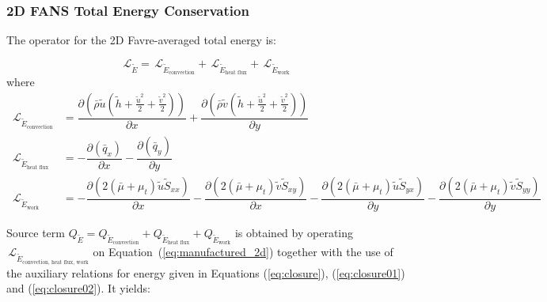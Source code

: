 \documentclass[10pt]{article}
\newcommand{\Diff}[2] {\dfrac{\partial\left( #1\right)}{\partial #2}}
\newcommand{\diff}[2] {\dfrac{\partial #1}{\partial #2}}
\newcommand{\Lo}{\,\mathcal{L}}
\newcommand{\brho}{\bar{\rho}}
\newcommand{\bq}{\bar{q}}
\newcommand{\tu}{\tilde{u}}
\newcommand{\tv}{\tilde{v}}
\newcommand{\tS}{\tilde{S}}
\newcommand{\tE}{\tilde{E}}
\newcommand{\bmu}{\bar{\mu}}
\newcommand{\hh}{\tilde{h}}
\begin{document}
\subsubsection{2D FANS Total Energy Conservation}

The operator for the 2D  Favre-averaged total energy is:

\begin{equation*}
 \Lo_{\tE}= \Lo_{\tE_\text{convection}} + \Lo_{\tE_\text{heat flux}}+\Lo_{\tE_\text{work}}
\end{equation*}
where
\begin{equation}
\begin{split}\label{eq:E_operators}
\Lo_{\tE_\text{convection}}&= \Diff{\brho \tu \left(\hh+ \frac{\tu^2}{2} +\frac{\tv^2 }{2} \right) }{x}+\Diff{\brho \tv \left(\hh+ \frac{\tu^2}{2} +\frac{\tv^2 }{2}  \right)}{y}\\
\Lo_{\tE_\text{heat flux}}&=- \Diff{\bq_x}{x} -\Diff{\bq_y}{y}\\ %
\Lo_{\tE_\text{work}}&=-\Diff{2(\bmu+\mu_t)\tu \tS_{xx}}{x}-\Diff{2(\bmu+\mu_t)\tv \tS_{xy}}{x}-\Diff{2(\bmu+\mu_t) \tu \tS_{yx}}{y}-\Diff{2(\bmu+\mu_t)\tv \tS_{yy}}{y}
\end{split}
\end{equation}

Source term $Q_{\tE}=Q_{\tE_\text{convection}} + Q_{\tE_\text{heat flux}}+ Q_{\tE_\text{work}}$ is obtained by operating $ \Lo_{\tE_\text{convection, heat flux, work}}$ on Equation~(\ref{eq:manufactured_2d}) together with the use of the  auxiliary relations for energy given in Equations (\ref{eq:closure}), (\ref{eq:closure01}) and (\ref{eq:closure02}). It yields:
\end{document}
